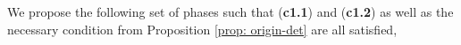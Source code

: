 \begin{comment}
{\it Remark.} In Lemma \ref{lem: phase-ineq}, $\Msub[:,1]$ and $\Msub[:,6]$ being independent only guarantees $\det(\Msub[-k_{\V{\omega}},:])\neq 0$. However, \eqref{eq: m0-cramer} implies that $|m_0(\V{\omega})|\propto \det(\Msub[-k_{\V{\omega}},:])$ hence it is preferred to maximize the determinant. Since
\begin{align*}
\det(\Msub[-k_{\V{\omega}}, :]) = \det\big(\big[\, \Msub[-k_{\V{\omega}},-6], \;\Msub[-k_{\V{\omega}},6] + c \cdot\Msub[-k_{\V{\omega}},1]  \,\big]\big),\quad 
\end{align*}
$\forall c\in \mathbb{C}$, the angle between $\Msub[:,1]$ and $\Msub[:,6]$ should be maximized.
Therefore, a stronger condition than ({\bf c1.1}) is to require $\Msub[:,1]$ and $\Msub[:,6]$ be orthogonal, which is equivalent to 
\begin{align*}
(\V{\eta}_1-\V{\eta}_6)^\top(\pi/2, \pi/2) = \pi \,(\text{mod}\, 2\pi).\tag{\bf c2.1}
\end{align*}
The stronger condition corresponding to ({\bf c1.2}) is 
\begin{align*}
(\V{\eta}_3-\V{\eta}_4)^\top(-\pi/2,\pi/2)=\pi(\text{mod},\,2\pi).\tag{\bf c2.2}
\end{align*} %


Unfortunately, Proposition \ref{prop: origin-det} prevents ({\bf c2.1}) and ({\bf c2.2}) from holding simultaneously.
\end{comment}
We propose the following set of phases such that ({\bf c1.1}) and ({\bf c1.2}) as well as the necessary condition from Proposition \ref{prop: origin-det} are all satisfied,
